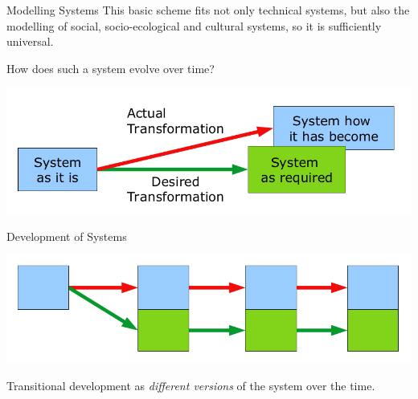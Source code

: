 \documentclass{beamer}
\begin{document}
\begin{frame}{Modelling Systems}
  This basic scheme fits not only technical systems, but also the modelling of
  social, socio-ecological and cultural systems, so it is sufficiently
  universal.

How does such a system evolve over time?
\begin{center}
  \includegraphics[width=.9\textwidth]{SD-2.png}
\end{center}
\end{frame}

\begin{frame}{Development of Systems}
\begin{center}
  \includegraphics[width=.9\textwidth]{SD-3.png}
\end{center}
Transitional development as \emph{different versions} of the system over the
time.
\end{frame}
\end{document}
